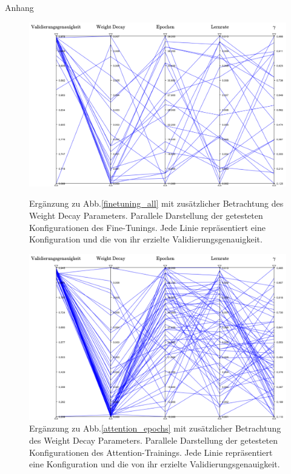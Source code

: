 \newpage
{}
\pagestyle{empty}
\vspace*{7cm}
\begin{center}
{\Huge Anhang}
\end{center}
\newpage
\pagestyle{fancy}

\setcounter{figure}{0}
\renewcommand{\thefigure}{\Roman{figure}}


\begin{figure}[h]
\centering
\includegraphics[scale=0.52]{NNOPT/Anhang/layer3_with_weigth_decay_finetuning}
\caption{Ergänzung zu Abb.\ref{finetuning_all} mit zusätzlicher Betrachtung des Weight Decay Parameters. Parallele Darstellung der getesteten Konfigurationen des Fine-Tunings. Jede Linie repräsentiert eine Konfiguration und die von ihr erzielte Validierungsgenauigkeit.}
\label{weight_decay_1}
\includegraphics[scale=0.52]{NNOPT/Anhang/layer3_with_weigth_decay_attention}
\caption{Ergänzung zu Abb.\ref{attention_epochs} mit zusätzlicher Betrachtung des Weight Decay Parameters. Parallele Darstellung der getesteten Konfigurationen des Attention-Trainings. Jede Linie repräsentiert eine Konfiguration und die von ihr erzielte Validierungsgenauigkeit.}
\label{weight_decay_2}
\end{figure}

